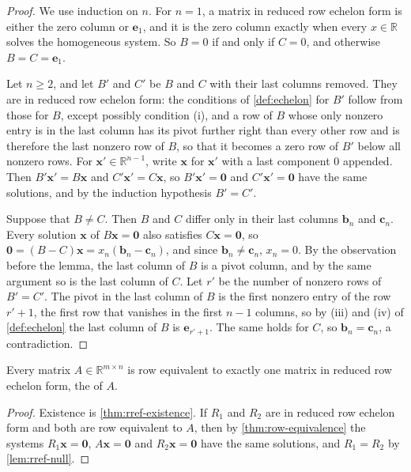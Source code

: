 \begin{proof}
We use induction on $n$. For $n=1$, a matrix in reduced row echelon form is either the zero column or $\mathbf e_1$, and it is the zero column exactly when every $x\in\mathbb R$ solves the homogeneous system. So $B=0$ if and only if $C=0$, and otherwise $B=C=\mathbf e_1$.

Let $n\ge2$, and let $B'$ and $C'$ be $B$ and $C$ with their last columns removed. They are in reduced row echelon form: the conditions of \cref{def:echelon} for $B'$ follow from those for $B$, except possibly condition (i), and a row of $B$ whose only nonzero entry is in the last column has its pivot further right than every other row and is therefore the last nonzero row of $B$, so that it becomes a zero row of $B'$ below all nonzero rows. For $\mathbf x'\in\mathbb R^{n-1}$, write $\mathbf x$ for $\mathbf x'$ with a last component $0$ appended. Then $B'\mathbf x'=B\mathbf x$ and $C'\mathbf x'=C\mathbf x$, so $B'\mathbf x'=\mathbf 0$ and $C'\mathbf x'=\mathbf 0$ have the same solutions, and by the induction hypothesis $B'=C'$.

Suppose that $B\ne C$. Then $B$ and $C$ differ only in their last columns $\mathbf b_n$ and $\mathbf c_n$. Every solution $\mathbf x$ of $B\mathbf x=\mathbf 0$ also satisfies $C\mathbf x=\mathbf 0$, so $\mathbf 0=(B-C)\mathbf x=x_n(\mathbf b_n-\mathbf c_n)$, and since $\mathbf b_n\ne\mathbf c_n$, $x_n=0$. By the observation before the lemma, the last column of $B$ is a pivot column, and by the same argument so is the last column of $C$. Let $r'$ be the number of nonzero rows of $B'=C'$. The pivot in the last column of $B$ is the first nonzero entry of the row $r'+1$, the first row that vanishes in the first $n-1$ columns, so by (iii) and (iv) of \cref{def:echelon} the last column of $B$ is $\mathbf e_{r'+1}$. The same holds for $C$, so $\mathbf b_n=\mathbf c_n$, a contradiction.
\end{proof}

\begin{theorem}
\label{thm:rref-unique}
Every matrix $A\in\mathbb R^{m\times n}$ is row equivalent to exactly one matrix in reduced row echelon form, the  of $A$.
\end{theorem}

\begin{proof}
Existence is \cref{thm:rref-existence}. If $R_1$ and $R_2$ are in reduced row echelon form and both are row equivalent to $A$, then by \cref{thm:row-equivalence} the systems $R_1\mathbf x=\mathbf 0$, $A\mathbf x=\mathbf 0$ and $R_2\mathbf x=\mathbf 0$ have the same solutions, and $R_1=R_2$ by \cref{lem:rref-null}.
\end{proof}

